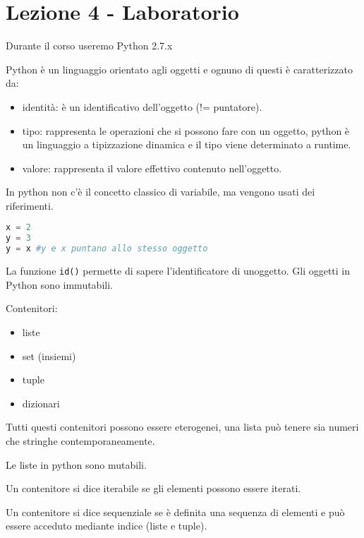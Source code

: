 \section{Lezione 4 - Laboratorio}\label{lezione-4---laboratorio}

Durante il corso useremo Python 2.7.x

Python è un linguaggio orientato agli oggetti e ognuno di questi è caratterizzato da:

\begin{itemize}
\item
  identità: è un identificativo dell'oggetto (!= puntatore).
\item
  tipo: rappresenta le operazioni che si possono fare con un oggetto,
  python è un linguaggio a tipizzazione dinamica e il tipo viene
  determinato a runtime.
\item
  valore: rappresenta il valore effettivo contenuto nell'oggetto.
\end{itemize}

In python non c'è il concetto classico di variabile, ma vengono usati
dei riferimenti.

\begin{lstlisting}[language=Python, caption=Codice Python]
x = 2
y = 3
y = x #y e x puntano allo stesso oggetto
\end{lstlisting}

La funzione \texttt{id()} permette di sapere l'identificatore di unoggetto.
Gli oggetti in Python sono immutabili.

Contenitori:

\begin{itemize}
\item
  liste
\item
  set (insiemi)
\item
  tuple
\item
  dizionari
\end{itemize}

Tutti questi contenitori possono essere eterogenei, una lista può tenere
sia numeri che stringhe contemporaneamente.

Le liste in python sono mutabili.

Un contenitore si dice iterabile se gli elementi possono essere iterati.

Un contenitore si dice sequenziale se è definita una sequenza di
elementi e può essere acceduto mediante indice (liste e tuple).

